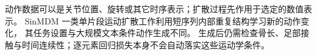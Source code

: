 动作数据可以是关节位置、旋转或其它时序表示；扩散过程先作用于选定的数值表示。
SinMDM 一类单片段运动扩散工作利用短序列内部重复结构学习新的动作变化，
其任务设置与大规模文本条件动作生成不同。
生成后仍需检查骨长、足部接触与时间连续性；逐元素回归损失本身不会自动落实这些运动学条件。
